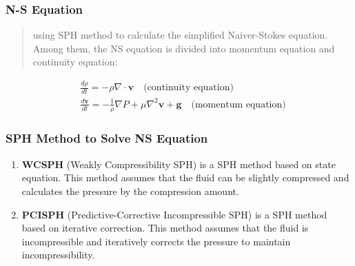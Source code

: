 \begin{frame}
    \frametitle{N-S Equation}
    \begin{quote} using SPH method to calculate the simplified Naiver-Stokes equation. Among them, the NS equation is divided into momentum equation and continuity equation: \end{quote}
    \begin{equation}
        \begin{aligned}
        &\frac{d\rho}{dt}=-\rho\nabla·\boldsymbol{v}\quad\text{(continuity equation)} \\
        &\frac{d\boldsymbol{v}}{dt}=-\frac{1}{\rho}\nabla P + \mu\nabla ^2\boldsymbol{v}+ \boldsymbol{g} \quad\text{(momentum equation)}
        \end{aligned}
    \end{equation}
\end{frame}

\begin{frame}
    \frametitle{SPH Method to Solve NS Equation}
    \begin{enumerate}
        \item \textbf{WCSPH} (Weakly Compressibility SPH) is a SPH method based on state equation. This method assumes that the fluid can be slightly compressed and calculates the pressure by the compression amount.
        \item \textbf{PCISPH} (Predictive-Corrective Incompressible SPH) is a SPH method based on iterative correction. This method assumes that the fluid is incompressible and iteratively corrects the pressure to maintain incompressibility.
    \end{enumerate}
\end{frame}

